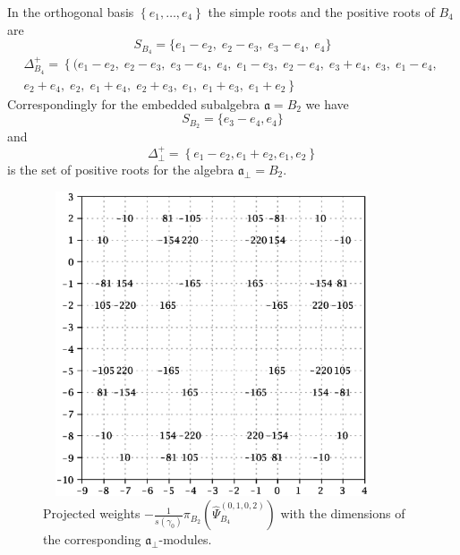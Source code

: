 \documentclass[12pt]{iopart}
\theoremstyle{definition}
\theoremstyle{definition}
\theoremstyle{definition}
\begin{document}
In the orthogonal basis $\left\{e_1,\dots,e_4\right\}$ the simple roots and the positive roots of $B_4$ are
\begin{equation*}
  \label{eq:8}
 S_{B_4}= \{e_1 - e_2,\; e_2 - e_3,\; e_3 - e_4,\; e_4\}
\end{equation*}
\begin{eqnarray*}
  \label{eq:19}
 \Delta^+_{B_4}=\left\{ (e_1 - e_2,\; e_2 - e_3,\; e_3 - e_4,\; e_4,\; e_1 - e_3,\; e_2 - e_4,\; e_3 + e_4,\; e_3,\; e_1 - e_4,\;\right.\\
 \left. e_2 + e_4,\; e_2,\; e_1 + e_4,\; e_2 + e_3,\; e_1,\; e_1 + e_3,\; e_1 + e_2\right\}
\end{eqnarray*}
Correspondingly for the embedded subalgebra $\mathfrak{a}=B_2$ we have
\begin{equation*}
  \label{eq:26}
 S_{B_2}=\{e_3-e_4,e_4\}
\end{equation*}
and
\begin{equation*}
  \label{eq:27}
 \Delta^{+}_{\bot}= \left\{e_1-e_2,e_1+e_2,e_1,e_2\right\}
\end{equation*}
is the set of positive roots for the algebra $\mathfrak{a}_{\bot}=B_2$.
\begin{figure}[t]
  \centering
    \includegraphics[width=100mm,height=90mm]{figure4.eps}
  \caption{Projected weights $-\frac{1}{s(\gamma_0)}\pi_{B_2}\left(\hat \Psi^{(0,1,0,2)}_{B_4}\right)$
  with the dimensions of the corresponding $\mathfrak{a}_{\bot}$-modules.}
  \label{fig:B4B2anom}
\end{figure}
\end{document}
